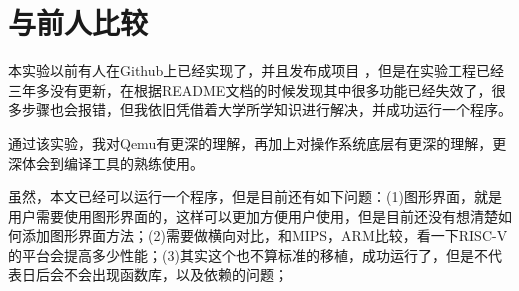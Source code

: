 \section{与前人比较}
本实验以前有人在Github上已经实现了，并且发布成项目 \cite{BusyBear} ，但是在实验工程已经三年多没有更新，在根据README文档的时候发现其中很多功能已经失效了，很多步骤也会报错，但我依旧凭借着大学所学知识进行解决，并成功运行一个程序。

通过该实验，我对Qemu有更深的理解，再加上对操作系统底层有更深的理解，更深体会到编译工具的熟练使用。

虽然，本文已经可以运行一个程序，但是目前还有如下问题：(1)图形界面，就是用户需要使用图形界面的，这样可以更加方便用户使用，但是目前还没有想清楚如何添加图形界面方法；(2)需要做横向对比，和MIPS，ARM比较，看一下RISC-V的平台会提高多少性能；(3)其实这个也不算标准的移植，成功运行了，但是不代表日后会不会出现函数库，以及依赖的问题；

